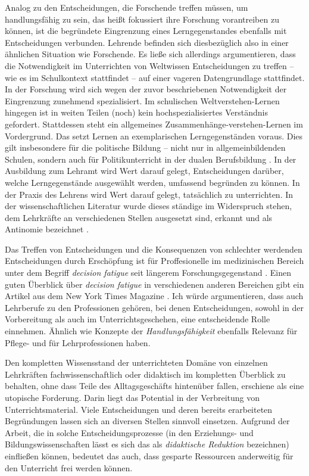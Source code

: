 Analog zu den Entscheidungen, die Forschende treffen müssen, um handlungsfähig zu sein, das heißt fokussiert ihre Forschung vorantreiben zu können, ist die begründete Eingrenzung eines Lerngegenstandes ebenfalls mit Entscheidungen verbunden. 
Lehrende befinden sich diesbezüglich also in einer ähnlichen Situation wie Forschende. 
Es ließe sich allerdings argumentieren, dass die Notwendigkeit im Unterrichten von Weltwissen Entscheidungen zu treffen -- wie es im Schulkontext stattfindet -- auf einer vageren Datengrundlage stattfindet. In der Forschung wird sich wegen der zuvor beschriebenen Notwendigkeit der Eingrenzung zunehmend spezialisiert. Im schulischen Weltverstehen-Lernen hingegen ist in weiten Teilen (noch) kein hochspezialisiertes Verständnis gefordert. Stattdessen steht ein allgemeines Zusammenhänge-verstehen-Lernen im Vordergrund. Das setzt Lernen an exemplarischen Lerngegenständen voraus. 
Dies gilt insbesondere für die politische Bildung -- nicht nur in allgemeinbildenden Schulen, sondern auch für Politikunterricht in der dualen Berufsbildung \autocite[vgl. \gls{abs} \ref{bplan}, \gls{S} \pageref{bplan} \&][4; 9-13]{bplan}.
In der Ausbildung zum Lehramt wird Wert darauf gelegt, Entscheidungen darüber, welche Lerngegenstände ausgewählt werden, umfassend begründen zu können. 
In der Praxis des Lehrens wird Wert darauf gelegt, tatsächlich zu unterrichten.
In der wissenschaftlichen Literatur wurde dieses ständige im Widerspruch stehen, dem Lehrkräfte an verschiedenen Stellen ausgesetzt sind, erkannt und als Antinomie bezeichnet \autocite[\gls{vgl} \gls{zb}][]{Helsper.2001}. 

Das Treffen von Entscheidungen und die Konsequenzen von schlechter werdenden Entscheidungen durch Erschöpfung ist für Proffesionelle im medizinischen Bereich unter dem Begriff \emph{decision fatigue} seit längerem Forschungsgegenstand \autocite{Maier.2025}. Einen guten Überblick über \emph{decision fatigue} in verschiedenen anderen Bereichen gibt ein Artikel aus dem New York Times Magazine \autocite{Tierny.08.08.2011}. 
Ich würde argumentieren, dass auch Lehrberufe zu den Professionen gehören, bei denen Entscheidungen, sowohl in der Vorbereitung als auch im Unterrichtsgeschehen, eine entscheidende Rolle einnehmen. %
Ähnlich wie Konzepte der \emph{Handlungsfähigkeit} ebenfalls Relevanz für Pflege- und für Lehrprofessionen haben. 

Den kompletten Wissensstand der unterrichteten Domäne von einzelnen Lehrkräften fachwissenschaftlich oder didaktisch im kompletten Überblick zu behalten, ohne dass Teile des Alltagsgeschäfts hintenüber fallen, erschiene als eine utopische Forderung. Darin liegt das Potential in der Verbreitung von Unterrichtsmaterial. Viele Entscheidungen und deren bereits erarbeiteten Begründungen lassen sich an diversen Stellen sinnvoll einsetzen. Aufgrund der Arbeit, die in solche Entscheidungsprozesse (in den Erziehungs- und Bildungswissenschaften lässt es sich das als \emph{didaktische Reduktion} bezeichnen) einfließen können, bedeutet das auch, dass gesparte Ressourcen anderweitig für den Unterricht frei werden können. 

